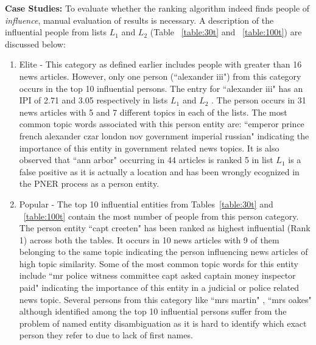 \noindent \textbf{Case Studies: } To evaluate whether the ranking algorithm indeed finds people of \emph{influence}, manual evaluation of results is necessary. A description of the influential people from lists $L_1$ and $L_2$  (Table ~\ref{table:30t} and ~\ref{table:100t}) are discussed below: 
\begin{enumerate}

\item Elite - This category as defined earlier includes people with greater than 16 news articles. However, only one person  (``alexander iii") from this category occurs in the top 10 influential persons. The entry for ``alexander iii" has an IPI of 2.71 and 3.05 respectively in lists $L_1$ and $L_2$ . The person occurs in 31 news articles with 5 and 7 different topics in each of the lists. The most common topic words associated with this person entity are: ``emperor prince french alexander czar london nov government imperial russian" indicating the importance of this entity in government related news topics. 
It is also observed that ``ann arbor" occurring in 44 articles is ranked 5 in list $L_1$ is a false positive as it is actually a location and has been wrongly ecognized in the PNER process as a person entity. 

\item Popular - The top 10 influential entities from Tables~\ref{table:30t} and ~\ref{table:100t} contain the most number of people from this person category. The person entity ``capt creeten" has been ranked as highest influential (Rank 1) across both the tables. It occurs in 10 news articles with 9 of them belonging to the same topic indicating the person influencing news articles of high topic similarity. Some of the most common topic words for this entity include ``mr police witness committee capt asked captain money inspector paid" indicating the importance of this entity in a judicial or police related news topic.
Several persons from this category like ``mrs martin" , ``mrs oakes"  although identified among the top 10 influential persons suffer from the problem of named entity disambiguation as it is hard to identify which exact person they refer to due to lack of first names.
 

\end{enumerate}
